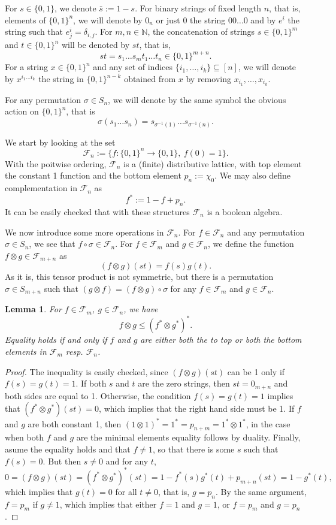 \documentclass[12pt]{article}
\newtheorem{lemma}{Lemma}
\theoremstyle{definition}
\theoremstyle{remark}
\def\Fe{\mathcal F}
\begin{document}
For $s\in \{0,1\}$, we denote $\bar s:=1-s$.
For binary strings of fixed length $n$, that is, elements of
$\{0,1\}^n$, we will denote by $0_n$ or just $0$ the string $00\dots0$ and by $e^i$ the
string such that $e^i_j=\delta_{i,j}$.  For $m,n\in \mathbb N$, the concatenation of 
strings $s\in \{0,1\}^m$ and $t\in \{0,1\}^n$ will be denoted by $st$, that is,
\[
st=s_1\dots s_mt_1\dots t_n\in \{0,1\}^{m+n}.
\]
For a string $x\in \{0,1\}^n$ and any set of indices $\{i_1,\dots,i_k\}\subseteq [n]$, we
will denote by $x^{i_1\dots i_k}$ the string in $\{0,1\}^{n-k}$ obtained from $x$ by removing
$x_{i_1},\dots, x_{i_k}$.

For any permutation $\sigma\in S_n$, we will denote by the same symbol the obvious action
on $\{0,1\}^n$, that is
\[
\sigma(s_1\dots s_n)=s_{\sigma^{-1}(1)}\dots s_{\sigma^{-1}(n)}.
\]

We start by looking at the set 
\[
\Fe_n:=\{f:\{0,1\}^n\to \{0,1\},\ f(0)=1\}.
\]
With the poitwise ordering, $\Fe_n$ is  a (finite) distributive lattice, with top element
 the constant 1 function and the bottom element $p_n:=\chi_{0}$.  We may also
define complementation  in $\Fe_n$ as
\[
f^*:=1-f+p_n.
\]
It can be easily checked that with these structures $\Fe_n$ is a boolean algebra.

We now introduce some more operations in $\Fe_n$. For $f\in \Fe_n$ and any permutation $\sigma\in S_n$, we see that $f\circ \sigma\in \Fe_n$.
For $f\in \Fe_{m}$ and $g\in \Fe_n$, we define
the function $f\otimes g\in \Fe_{m+n}$ as
\[
(f\otimes g)(st)=f(s)g(t). 
\]
As it is, this tensor product is not symmetric, but there is a permutation $\sigma\in S_{m+n}$ such that 
$(g\otimes f)=(f\otimes g)\circ \sigma$ for any $f\in \Fe_m$ and $g\in \Fe_n$.

\begin{lemma}\label{lemma:fproduct} For $f\in \Fe_m$, $g\in \Fe_n$, we have
\[
f\otimes g\le (f^*\otimes g^*)^*.
\]
Equality holds if and only if $f$ and $g$ are either both the to top or both the bottom elements in
$\Fe_m$ resp. $\Fe_n$.
\end{lemma}

\begin{proof} The inequality is easily  checked, since $(f\otimes g)(st)$ can be 1 only if
$f(s)=g(t)=1$. If both $s$ and $t$ are the zero strings, then $st=0_{m+n}$ and both sides
are equal to 1. Otherwise, the condition $f(s)=g(t)=1$ implies that $(f^*\otimes
g^*)(st)=0$, which implies that the right hand side must be 1. If $f$ and $g$ are both
constant 1, then $(1\otimes 1)^*=1^*=p_{n+m}=1^*\otimes 1^*$, in the case when both $f$
and $g$ are the minimal elements equality  follows by
duality. Finally, asume the equality holds and that $f\ne 1$, so that there is some $s$ such that 
$f(s)=0$. But then $s\ne 0$ and for any $t$,
\[
0=(f\otimes g)(st)=(f^*\otimes g^*)^*(st)=1-f^*(s)g^*(t)+p_{m+n}(st)=1-g^*(t),
\]
which implies that $g(t)=0$ for all $t\ne0$, that is, $g=p_n$. By the same argument,
$f=p_m$ if $g\ne 1$, which implies that either $f=1$ and $g=1$, or $f=p_m$ and $g=p_n$.



\end{proof}
\end{document}
